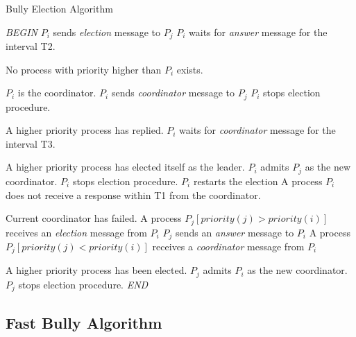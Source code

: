 \documentclass[dareport.tex]{subfiles}
\begin{document}
\begin{algorithm}[h]
	\caption{Bully Election Algorithm}
	\label{bully-algorithm}
	\begin{algorithmic}[1]
		\BState \emph{BEGIN}
			\State $P_{i}$ sends \emph{election} message to $P_{j}$
		\EndFor
		\State $P_{i}$ waits for \emph{answer} message for the interval T2.
		
		\Comment No process with priority higher than $P_{i}$ exists.
		
		\Comment $P_{i}$ is the coordinator.
				\State $P_{i}$ sends \emph{coordinator} message to $P_{j}$
			\EndFor
			\State $P_{i}$ stops election procedure.
		\Else
		
		\Comment A higher priority process has replied.
			\State $P_{i}$ waits for \emph{coordinator} message for the interval T3.
		
		\Comment A higher priority process has elected itself as the leader.
			\State $P_{i}$ admits $P_{j}$ as the new coordinator.
			\State $P_{i}$ stops election procedure.
		\Else
			\State {}
			\Comment $P_{i}$ restarts the election
		\EndIf
		\EndIf
		\EndProcedure
		\State A process $P_{i}$ does not receive a response within T1 from the coordinator.
		
		\Comment Current coordinator has failed.
		\State\indent {}
		\State A process $P_{j} \left[priority(j) > priority(i)\right]$ receives an \emph{election} message from $P_{i}$
		\State\indent $P_{j}$ sends an \emph{answer} message to $P_{i}$
		\State\indent {}
		\State A process $P_{j} \left[priority(j) < priority(i)\right]$ receives a \emph{coordinator} message from $P_{i}$
		
		\Comment A higher priority process has been elected.
		\State\indent $P_{j}$ admits $P_{i}$ as the new coordinator.
		\State\indent $P_{j}$ stops election procedure.
		\BState \emph{END}
	\end{algorithmic}
\end{algorithm}
\subsection{Fast Bully Algorithm} \label{ssec:fast-bully}
\end{document}
